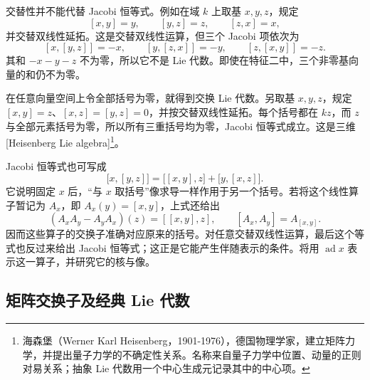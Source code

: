 交替性并不能代替 Jacobi 恒等式。例如在域 \(k\) 上取基 \(x,y,z\)，规定
\[
	[x,y]=y,\qquad [y,z]=z,\qquad [z,x]=x,
\]
并交替双线性延拓。这是交替双线性运算，但三个 Jacobi 项依次为
\[
	[x,[y,z]]=-x,\qquad [y,[z,x]]=-y,\qquad [z,[x,y]]=-z.
\]
其和 \(-x-y-z\) 不为零，所以它不是 Lie 代数。即使在特征二中，三个非零基向量的和仍不为零。
\begin{example}\label{b5:exm:abelian-heisenberg-lie}
	在任意向量空间上令全部括号为零，就得到交换 Lie 代数。另取基 \(x,y,z\)，规定 \([x,y]=z\)、\([x,z]=[y,z]=0\)，并按交替双线性延拓。每个括号都在 \(kz\)，而 \(z\) 与全部元素括号为零，所以所有三重括号均为零，Jacobi 恒等式成立。这是三维[Heisenberg Lie algebra]\footnote{海森堡（Werner Karl Heisenberg，1901-1976），德国物理学家，建立矩阵力学，并提出量子力学的不确定性关系。名称来自量子力学中位置、动量的正则对易关系；抽象 Lie 代数用一个中心生成元记录其中的中心项。}。
\end{example}
Jacobi 恒等式也可写成
\[
	\bigl[x,[y,z]\bigr]=\bigl[[x,y],z\bigr]+\bigl[y,[x,z]\bigr].
\]
它说明固定 \(x\) 后，“与 \(x\) 取括号”像求导一样作用于另一个括号。若将这个线性算子暂记为 \(A_x\)，即 \(A_x(y)=[x,y]\)，上式还给出
\[
	(A_xA_y-A_yA_x)(z)=[[x,y],z],\qquad [A_x,A_y]=A_{[x,y]}.
\]
因而这些算子的交换子准确对应原来的括号。对任意交替双线性运算，最后这个等式也反过来给出 Jacobi 恒等式；这正是它能产生伴随表示的条件。将用 \(\operatorname{ad}x\) 表示这一算子，并研究它的核与像。

\subsection{矩阵交换子及经典 Lie 代数}
\label{b5:subsec:1101:02}

